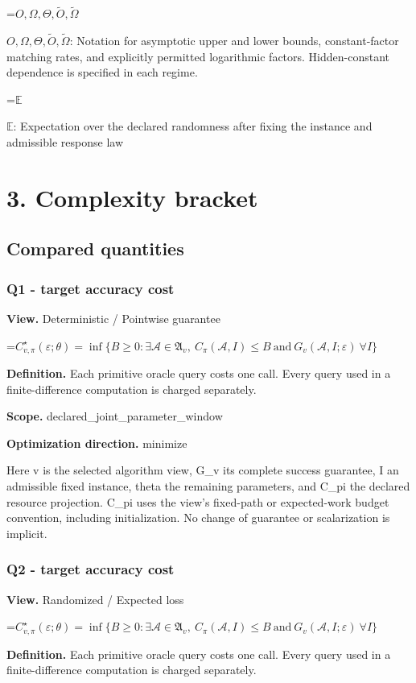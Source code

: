 \documentclass[10pt,a4paper]{article}
\newcommand{\AtlasMath}[1]{\par\begingroup\centering\setbox0=\hbox{$\displaystyle #1$}\ifdim\wd0>1.4\linewidth\typeout{ATLAS WIDE FORMULA: \the\wd0}\fi\ifdim\wd0>\linewidth\resizebox{\linewidth}{!}{\box0}\else\box0\fi\par\endgroup}
\newcommand{\AtlasInlineMath}[1]{\begingroup\setbox0=\hbox{$#1$}\ifdim\wd0>.4\linewidth\endgroup\AtlasMath{#1}\else\endgroup$#1$\fi}
\begin{document}
\AtlasInlineMath{O,\Omega,\Theta,\widetilde{O},\widetilde\Omega}: Notation for asymptotic upper and lower bounds, constant-factor matching rates, and explicitly permitted logarithmic factors. Hidden-constant dependence is specified in each regime.

\AtlasInlineMath{\mathbb{E}}: Expectation over the declared randomness after fixing the instance and admissible response law

\section{3. Complexity bracket}
\subsection{Compared quantities}
\subsubsection{Q1 - target accuracy cost}
\textbf{View.} Deterministic / Pointwise guarantee

\AtlasMath{C^\star_{v,\pi}(\varepsilon;\theta)=\inf\{B\ge0:\exists\mathcal A\in\mathfrak A_v,\ C_\pi(\mathcal A,I)\le B\ \text{and}\ G_v(\mathcal A,I;\varepsilon)\ \forall I\}}
\textbf{Definition.} Each primitive oracle query costs one call. Every query used in a finite-difference computation is charged separately.

\textbf{Scope.} declared\_joint\_parameter\_window

\textbf{Optimization direction.} minimize

Here v is the selected algorithm view, G\_v its complete success guarantee, I an admissible fixed instance, theta the remaining parameters, and C\_pi the declared resource projection. C\_pi uses the view's fixed-path or expected-work budget convention, including initialization. No change of guarantee or scalarization is implicit.

\subsubsection{Q2 - target accuracy cost}
\textbf{View.} Randomized / Expected loss

\AtlasMath{C^\star_{v,\pi}(\varepsilon;\theta)=\inf\{B\ge0:\exists\mathcal A\in\mathfrak A_v,\ C_\pi(\mathcal A,I)\le B\ \text{and}\ G_v(\mathcal A,I;\varepsilon)\ \forall I\}}
\textbf{Definition.} Each primitive oracle query costs one call. Every query used in a finite-difference computation is charged separately.
\end{document}
